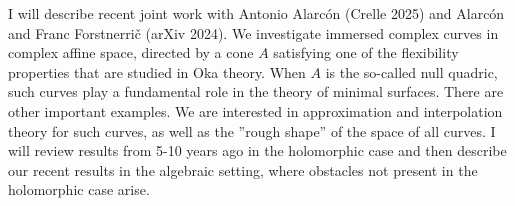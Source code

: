{%
    I will describe recent joint work with Antonio Alarcón
    (Crelle 2025) and Alarcón and Franc Forstnerrič (arXiv 2024).
    We investigate immersed complex curves in complex affine space,
    directed by a cone $A$ satisfying one of the flexibility
    properties that are studied in Oka theory. When $A$ is the
    so-called null quadric, such curves play a fundamental role in
    the theory of minimal surfaces. There are other important
    examples.  We are interested in approximation and interpolation
    theory for such curves, as well as the ''rough shape'' of the
    space of all curves. I will review results from 5-10 years ago
    in the holomorphic case and then describe our recent results in
    the algebraic setting, where obstacles not present in the
    holomorphic case arise.
}
